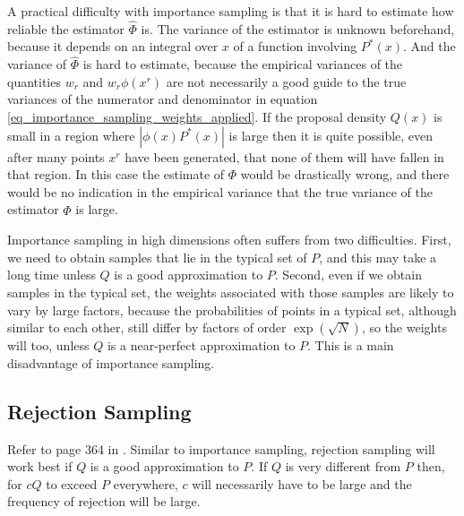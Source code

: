 \documentclass[10pt ]{article}
\begin{document}
A practical difficulty with importance sampling is that it is hard to estimate how reliable the estimator $\hat{\Phi}$ is. The variance of the estimator is unknown beforehand, because it depends on an integral over $x$ of a function involving $P^*(x)$. And the variance of $\hat{\Phi}$ is hard to estimate, because the empirical variances of the quantities $w_r$ and $w_r \phi(x^r)$ are not necessarily a good guide to the true variances of the numerator and denominator in equation \eqref{eq_importance_sampling_weights_applied}. If the proposal density $Q(x)$ is small in a region where $|\phi(x)P^*(x)|$ is large then it is quite possible, even after many points $x^r$ have been generated, that none of them will have fallen in that region. In this case the estimate of $\Phi$ would be drastically wrong, and there would be no indication in the empirical variance that the true variance of the estimator $\hat{\Phi}$ is large.

Importance sampling in high dimensions often suffers from two difficulties. First, we need to obtain samples that lie in the typical set of $P$, and this may take a long time unless $Q$ is a good approximation to $P$. Second, even if we obtain samples in the typical set, the weights associated with those samples are likely to vary by large factors, because the probabilities of points in a typical set, although similar to each other, still differ by factors of order $\exp(\sqrt{N})$, so the weights will too, unless $Q$ is a near-perfect approximation to $P$. This is a main disadvantage of importance sampling. 


\subsection{Rejection Sampling}

Refer to page 364 in \cite{mackay2003information}. Similar to importance sampling, rejection sampling will work best if $Q$ is a good approximation to $P$. If $Q$ is very different from $P$ then, for $c Q$ to exceed $P$ everywhere, $c$ will necessarily have to be large and the frequency of rejection will be large.
\end{document}
